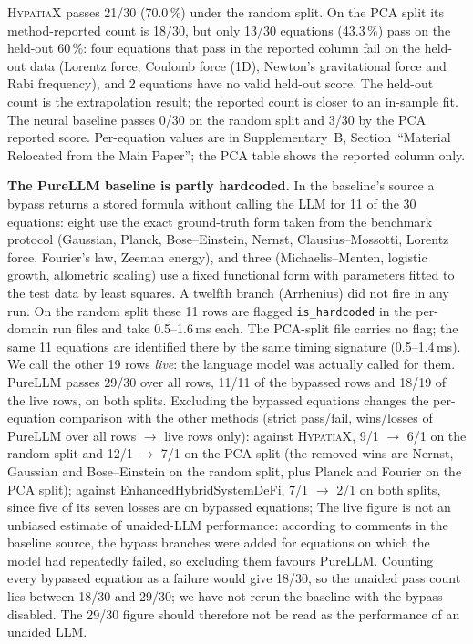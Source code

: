 \documentclass[twoside,11pt]{article}
\begin{document}
\textsc{HypatiaX} passes 21/30 (70.0\,\%) under the random split. On the PCA split its method-reported
count is 18/30, but only 13/30 equations (43.3\,\%) pass on the held-out 60\,\%: four equations that pass in
the reported column fail on the held-out data (Lorentz force, Coulomb force (1D), Newton's gravitational force and
Rabi frequency), and 2 equations have no valid held-out score. The
held-out count is the extrapolation result; the reported count is closer to an in-sample fit. The neural baseline
passes 0/30 on the random split and 3/30 by the PCA reported score. Per-equation values are in
Supplementary~B, Section~``Material Relocated from the Main Paper''; the PCA table shows the reported column only.

\textbf{The PureLLM baseline is partly hardcoded.} In the baseline's source
a bypass returns a stored formula without calling the LLM
for 11 of the 30 equations: eight use the exact ground-truth form taken from the benchmark protocol
(Gaussian, Planck, Bose--Einstein, Nernst, Clausius--Mossotti, Lorentz force, Fourier's law, Zeeman energy), and three
(Michaelis--Menten, logistic growth, allometric scaling) use a fixed functional form with parameters fitted to the
test data by least squares. A twelfth branch (Arrhenius) did not fire in any run. On the random split these 11 rows
are flagged \texttt{is\_hardcoded} in the per-domain run files and take 0.5--1.6\,ms each. The PCA-split file carries
no flag; the same 11 equations are identified there by the same timing signature (0.5--1.4\,ms). We call the other
19 rows \emph{live}: the language model was actually called for them. PureLLM passes 29/30 over all rows, 11/11 of the
bypassed rows and 18/19 of the live rows, on both splits. Excluding the bypassed equations changes the per-equation
comparison with the other methods (strict pass/fail, wins/losses of PureLLM over all rows $\rightarrow$ live rows only):
against \textsc{HypatiaX}, 9/1 $\rightarrow$ 6/1 on the random split and 12/1 $\rightarrow$ 7/1 on the PCA split (the removed
wins are Nernst, Gaussian and Bose--Einstein on the random split, plus Planck and Fourier on the PCA split); against
EnhancedHybridSystemDeFi, 7/1 $\rightarrow$ 2/1 on both splits, since five of its seven losses are on bypassed equations;
The live figure is not an
unbiased estimate of unaided-LLM performance: according to comments in the baseline source, the bypass branches were
added for equations on which the model had repeatedly failed, so excluding them favours PureLLM. Counting every bypassed
equation as a failure would give 18/30, so the unaided pass count lies between 18/30 and 29/30; we have not rerun the
baseline with the bypass disabled. The 29/30 figure should therefore not be read as the performance of an unaided LLM.
\end{document}
